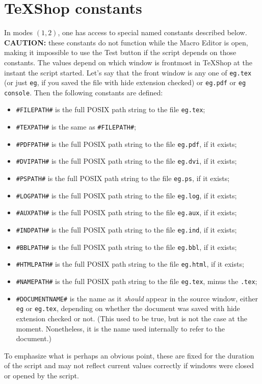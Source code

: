 \documentclass[11pt]{amsart}
\def\TeXShop{\TeX Shop\xspace}
\begin{document}
\section{\TeXShop constants} %
In modes $(1,2)$, one has access to special named constants described below. \textbf{CAUTION:} these constants do not function while the \textsf{Macro Editor} is open, making it impossible to use the \textsf{Test} button if the script depends on those constants. The values depend on which window is frontmost in \TeXShop at the instant the script started. Let's say that the front window is any one of {\tt eg.tex} (or just {\tt eg}, if you saved the file with \textsf{hide extension} checked) or {\tt eg.pdf} or {\tt eg console}. Then the following constants are defined:
\begin{itemize}
\item
\verb|#FILEPATH#| is the full POSIX path string to the file {\tt eg.tex};
\item
\verb|#TEXPATH#| is the same as \verb|#FILEPATH#|;
\item
\verb|#PDFPATH#| is the full POSIX path string to the file {\tt eg.pdf}, if it exists;
\item
\verb|#DVIPATH#| is the full POSIX path string to the file {\tt eg.dvi}, if it exists;
\item
\verb|#PSPATH#| is the full POSIX path string to the file {\tt eg.ps}, if it exists;
\item
\verb|#LOGPATH#| is the full POSIX path string to the file {\tt eg.log}, if it exists;
\item
\verb|#AUXPATH#| is the full POSIX path string to the file {\tt eg.aux}, if it exists;
\item
\verb|#INDPATH#| is the full POSIX path string to the file {\tt eg.ind}, if it exists;
\item
\verb|#BBLPATH#| is the full POSIX path string to the file {\tt eg.bbl}, if it exists;
\item
\verb|#HTMLPATH#| is the full POSIX path string to the file {\tt eg.html}, if it exists;
\item
\verb|#NAMEPATH#| is the full POSIX path string to the file {\tt eg.tex}, minus the {\tt.tex};
\item
\verb|#DOCUMENTNAME#| is the name as it \emph{should} appear in the source window, either {\tt eg} or {\tt eg.tex}, depending on whether the document was saved with \textsf{hide extension} checked or not. (This used to be true, but is not the case at the moment. Nonetheless, it is the name used internally to refer to the document.)
\end{itemize}
To emphasize what is perhaps an obvious point, these are fixed for the duration of the script and may not reflect current values correctly if windows were closed or opened by the script. 
\end{document}
